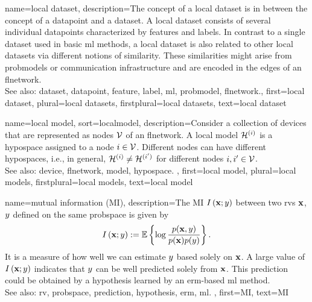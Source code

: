 {name={local dataset},
	description={The concept of a local \gls{dataset} is 
		in between the concept of a \gls{datapoint} and a \gls{dataset}. A local \gls{dataset} consists of several 
		individual \glspl{datapoint} characterized by \glspl{feature} and \glspl{label}. 
		In contrast to a single \gls{dataset} used in basic \gls{ml} methods, a local \gls{dataset} is also 
		related to other local \glspl{dataset} via different notions of similarity. These similarities 
		might arise from \glspl{probmodel} or communication infrastructure and 
		are encoded in the edges of an \gls{flnetwork}.
				\\
		See also: \gls{dataset}, \gls{datapoint}, \gls{feature}, \gls{label}, \gls{ml}, \gls{probmodel}, \gls{flnetwork}.},
	first={local dataset},
	plural={local datasets}, 
	firstplural={local datasets}, 
	text={local dataset}
}
	
{name={local model},
sort={localmodel},
	description={Consider a collection of \glspl{device} that are represented 
		as nodes $\mathcal{V}$ of an \gls{flnetwork}. A local \gls{model} $\mathcal{H}^{(i)}$ 
		is a \gls{hypospace} assigned to a node $i \in \mathcal{V}$. Different nodes can have 
		different \glspl{hypospace}, i.e., in general, $\mathcal{H}^{(i)} \neq \mathcal{H}^{(i')}$ 
		for different nodes $i, i' \in \mathcal{V}$. 
				\\
		See also: \gls{device}, \gls{flnetwork}, \gls{model}, \gls{hypospace}. },
	first={local model},
	plural={local models}, 
	firstplural={local models}, 
	text={local model}
}
	
{name={mutual information (MI)},
 	description={The MI $I \left( {\bf x};y\right)$ 
 		between two \glspl{rv} ${\bf x}$, $y$ defined on the same \gls{probspace} 
 		is given by \cite{coverthomas} $$I \left( {\bf x};y\right) := 
		\mathbb{E} \left\{ \log \frac{p ({\bf x},y)}{p({\bf x})p(y)} \right\}.$$ 
		It is a \gls{measure} of how well we can estimate $y$ based 
		solely on ${\bf x}$. A large value of $I \left( {\bf x};y\right)$ indicates that 
		$y$ can be well predicted solely from ${\bf x}$. This \gls{prediction} could be obtained by a 
		\gls{hypothesis} learned by an \gls{erm}-based \gls{ml} method. 
				\\
		See also: \gls{rv}, \gls{probspace}, \gls{prediction}, \gls{hypothesis}, \gls{erm}, \gls{ml}. }, 
	first={MI}, 
	text={MI} 
}

